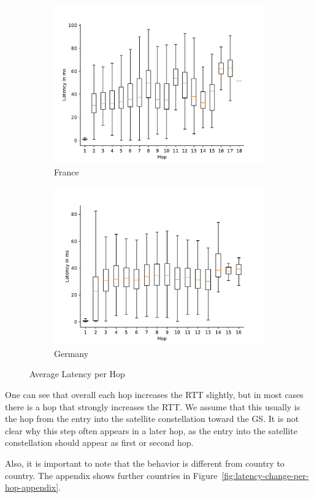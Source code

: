 \begin{figure}
\begin{subfigure}[b]{0.48\linewidth}
		\includegraphics[width=\linewidth]{chapters/4-results/traceroute/img/latency-per-hop-FR.pdf}
		\caption{France}
	\end{subfigure}
	\begin{subfigure}[b]{0.48\linewidth}
		\includegraphics[width=\linewidth]{chapters/4-results/traceroute/img/latency-per-hop-DE.pdf}
		\caption{Germany}
	\end{subfigure}
	\caption{Average Latency per Hop}
	\label{fig:latency-change-per-hop}
\end{figure}

One can see that overall each hop increases the RTT slightly, but in most cases
there is a hop that strongly increases the RTT. We assume that this usually is
the hop from the entry into the satellite constellation toward the \ac{GS}. It
is not clear why this step often appears in a later hop, as the entry into the
satellite constellation should appear as first or second hop.

Also, it is important to note that the behavior is different from country to
country. The appendix shows further countries in
Figure~\ref{fig:latency-change-per-hop-appendix}.
